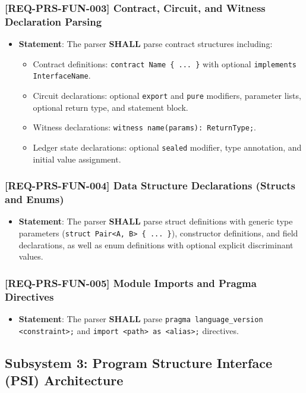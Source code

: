 \subsubsection{[REQ-PRS-FUN-003] Contract, Circuit, and Witness Declaration Parsing}
\begin{itemize}
    \item \textbf{Statement}: The parser \textbf{SHALL} parse contract structures including:
    \begin{itemize}
        \item Contract definitions: \texttt{contract Name \{ ... \}} with optional \texttt{implements InterfaceName}.
        \item Circuit declarations: optional \texttt{export} and \texttt{pure} modifiers, parameter lists, optional return type, and statement block.
        \item Witness declarations: \texttt{witness name(params): ReturnType;}.
        \item Ledger state declarations: optional \texttt{sealed} modifier, type annotation, and initial value assignment.
    \end{itemize}
\end{itemize}

\subsubsection{[REQ-PRS-FUN-004] Data Structure Declarations (Structs and Enums)}
\begin{itemize}
    \item \textbf{Statement}: The parser \textbf{SHALL} parse struct definitions with generic type parameters (\texttt{struct Pair<A, B> \{ ... \}}), constructor definitions, and field declarations, as well as enum definitions with optional explicit discriminant values.
\end{itemize}

\subsubsection{[REQ-PRS-FUN-005] Module Imports and Pragma Directives}
\begin{itemize}
    \item \textbf{Statement}: The parser \textbf{SHALL} parse \texttt{pragma language\_version <constraint>;} and \texttt{import <path> as <alias>;} directives.
\end{itemize}

\subsection{Subsystem 3: Program Structure Interface (PSI) Architecture}
\label{sec:subsystem_psi}

